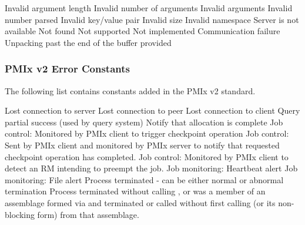 \begin{constantdesc}
Invalid argument length
%
Invalid number of arguments
%
Invalid arguments
%
Invalid number parsed
%
Invalid key/value pair
%
Invalid size
%
Invalid namespace
%
Server is not available
%
Not found
%
Not supported
%
Not implemented
%
Communication failure
%
Unpacking past the end of the buffer provided
%
\end{constantdesc}

\subsubsection{PMIx v2 Error Constants}

The following list contains constants added in the PMIx v2 standard.

\begin{constantdesc}
%
Lost connection to server
%
Lost connection to peer
%
Lost connection to client
%
Query partial success (used by query system)
%
Notify that allocation is complete
%
Job control: Monitored by PMIx client to trigger checkpoint operation
%
Job control: Sent by PMIx client and monitored by PMIx server to notify that requested checkpoint operation has completed.
%
Job control: Monitored by PMIx client to detect an \ac{RM} intending to preempt the job.
%
Job monitoring: Heartbeat alert
%
Job monitoring: File alert
%
Process terminated - can be either normal or abnormal termination
%
Process terminated without calling , or was a member of an assemblage formed via  and terminated or called  without first calling  (or its non-blocking form) from that assemblage.
%
\end{constantdesc}


